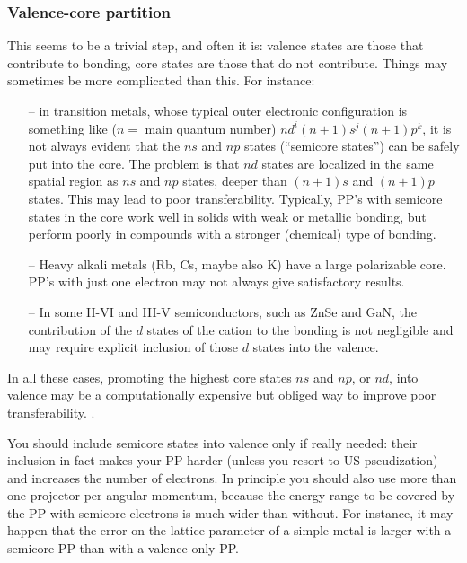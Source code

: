 \documentclass[12pt,a4paper]{article}
\begin{document}
\subsubsection{Valence-core partition}
\label{ValCore}
This seems to be a trivial step, and often it is: valence states 
are those that contribute to bonding, core states are those that 
do not contribute. Things may sometimes be more complicated than 
this. For instance:
\begin{enumerate}
\item[--] in transition metals, whose typical outer electronic
configuration is something like ($n=$ main quantum number)
$nd^i(n+1)s^j(n+1)p^k$, it is not
always evident that the $ns$ and $np$ states (``semicore states'')
can be safely put into the core. The problem is that $nd$ states 
are localized in the same spatial region as $ns$ and $np$ states, 
deeper than $(n+1)s$ and $(n+1)p$ states. This may lead to poor 
transferability. Typically, PP's with semicore states in the core 
work well in solids with weak or metallic bonding, but perform poorly 
in compounds with a stronger (chemical) type of bonding.
\item[--] Heavy alkali metals (Rb, Cs, maybe also K) have a large
polarizable core. PP's with just one electron may not always give
satisfactory results.
\item[--] In some II-VI and III-V semiconductors, such as ZnSe and
GaN, the contribution of the $d$ states of the cation to the bonding 
is not negligible and may require explicit inclusion of those $d$ 
states into the valence.
\end{enumerate}
In all these cases, promoting the highest core states $ns$ and $np$,
or $nd$, into valence may be a computationally
expensive but obliged way to improve poor transferability. . 

You should include semicore states into valence only if really needed:
their inclusion in fact makes your PP harder (unless you resort to 
US pseudization) and increases the number of electrons. In principle 
you should also use more than one projector per angular momentum, 
because the energy range to be covered by the PP with semicore electrons 
is much wider than without. For instance, it may happen that the error 
on the lattice parameter of a simple metal is larger
with a semicore PP than with a valence-only PP.
\end{document}
